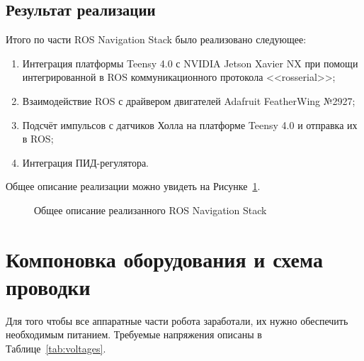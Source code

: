 \subsection{Результат реализации}

Итого по части ROS Navigation Stack было реализовано следующее:
\begin{enumerate}[beginpenalty=10000] %
  \item Интеграция платформы Teensy 4.0 с NVIDIA Jetson Xavier NX при помощи интегрированной в ROS коммуникационного протокола <<rosserial>>;
  \item Взаимодействие ROS с драйвером двигателей Adafruit FeatherWing №2927;
  \item Подсчёт импульсов с датчиков Холла на платформе Teensy 4.0 и отправка их в ROS;
  \item Интеграция ПИД-регулятора. 
\end{enumerate}

Общее описание реализации можно увидеть на Рисунке~\cref{fig:navstack}.

\begin{figure}[ht]
    \caption{Общее описание реализанного ROS Navigation Stack}\label{fig:navstack}
\end{figure}

\section{Компоновка оборудования и схема проводки}

Для того чтобы все аппаратные части робота заработали, их нужно обеспечить необходимым питанием. Требуемые напряжения описаны в Таблице~\cref{tab:voltages}.

